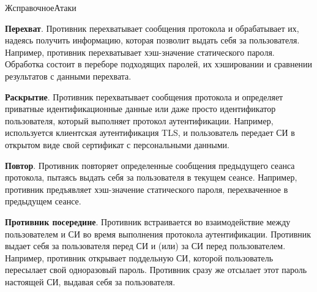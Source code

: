 \begin{appendix}{Ж}{справочное}{Атаки}

{\bf Перехват}. 
Противник перехватывает сообщения протокола и обрабатывает их,
надеясь получить информацию, которая позволит выдать себя за пользователя. 
Например, противник перехватывает хэш-значение статического пароля.
Обработка состоит в переборе подходящих паролей, их хэшировании и 
сравнении результатов с данными перехвата. 


{\bf Раскрытие}. 
Противник перехватывает сообщения протокола и 
определяет приватные идентификационные данные или даже просто 
идентификатор пользователя, который выполняет протокол аутентификации.
% 
Например, используется клиентская аутентификация TLS, 
и пользователь передает СИ в открытом виде
свой сертификат с персональными данными.


{\bf Повтор}. 
Противник повторяет определенные сообщения предыдущего сеанса протокола,
пытаясь выдать себя за пользователя в текущем сеансе. 
%
Например, противник предъявляет хэш-значение статического пароля,
перехваченное в предыдущем сеансе.


{\bf Противник посередине}. 
Противник встраивается во взаимодействие между пользователем и СИ во время
выполнения протокола аутентификации. Противник выдает себя 
за пользователя перед СИ и (или) за СИ перед пользователем. 
Например, противник открывает поддельную СИ, которой пользователь 
пересылает свой одноразовый пароль. Противник сразу же отсылает
этот пароль настоящей СИ, выдавая себя за пользователя.



\end{appendix}
